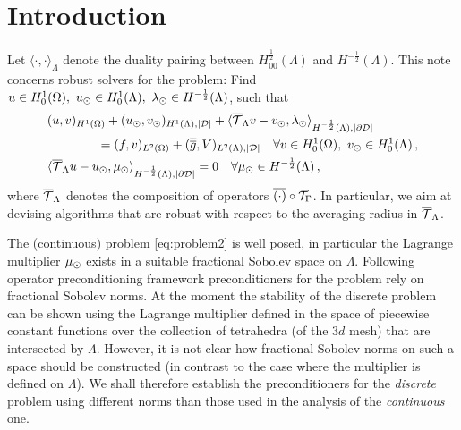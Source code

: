 \documentclass[r]{siamart171218}
\begin{document}
\newtheorem{thm}{Theorem}[section]
\newtheorem{prop}{Property}[section]
\theoremstyle{remark}
\newtheorem{remark}{Remark}[section]
 
\section{Introduction}\label{sec:intro}

Let $\langle \cdot , \cdot \rangle_\Lambda$ denote the duality pairing between 
$H^\frac12_{00}(\Lambda)$ and $H^{-\frac12}(\Lambda)$. This note concerns robust
solvers for the problem:
Find $u \in H^1_0(\Omega),\ u_{\odot} \in H^1_0(\Lambda), \ \lambda_{\odot} \in H^{-\frac12}(\Lambda)$, such that
\begin{subequations}\label{eq:problem2}
\begin{align}
&(u,v)_{H^1(\Omega)} + (u_{\odot},v_{\odot})_{H^1(\Lambda),|\mathcal{D}|} 
+  \langle {\overline{\mathcal{T}}_\Lambda} v - v_{\odot}, \lambda_{\odot} \rangle_{H^{-\frac12}(\Lambda), |\partial\mathcal{D}|} 
\\
\nonumber
&\qquad\qquad= (f,v)_{L^2(\Omega)} +  (\overline{\overline{g}},V)_{L^2(\Lambda),|\mathcal{D}|}
\quad \forall v \in H^1_0(\Omega), \ v_{\odot} \in H^1_0(\Lambda)\,,
\\
&   \langle {\overline{\mathcal{T}}_\Lambda} u -   u_{\odot}, \mu_{\odot} \rangle_{H^{-\frac12}(\Lambda),|\partial\mathcal{D}|} = 0
\quad \forall \mu_{\odot} \in H^{-\frac12}(\Lambda)\,,
\end{align}
\end{subequations}
where ${\overline{\mathcal{T}}_\Lambda}$ denotes the composition of operators $\overline{(\cdot)} \circ {\mathcal{T}_\Gamma} $.
In particular, we aim at devising algorithms that are robust with respect to
the averaging radius in ${\overline{\mathcal{T}}_\Lambda}$.

The (continuous) problem \eqref{eq:problem2} is well posed, in particular
the Lagrange multiplier $\mu_{\odot}$ exists in a suitable fractional Sobolev space on
$\Lambda$. Following operator preconditioning framework \cite{mardal2011preconditioning} preconditioners
for the problem rely on fractional Sobolev norms. At the moment the stability
of the discrete problem can be shown using the Lagrange multiplier defined
in the space of piecewise constant functions over the collection of tetrahedra
(of the 3$d$ mesh) that are intersected by $\Lambda$. However, it is not clear
how fractional Sobolev norms on such a space should be constructed (in contrast
to the case where the multiplier is defined on $\Lambda$). We shall therefore
establish the preconditioners for the \emph{discrete} problem using different
norms than those used in the analysis of the \emph{continuous} one.
\end{document}
